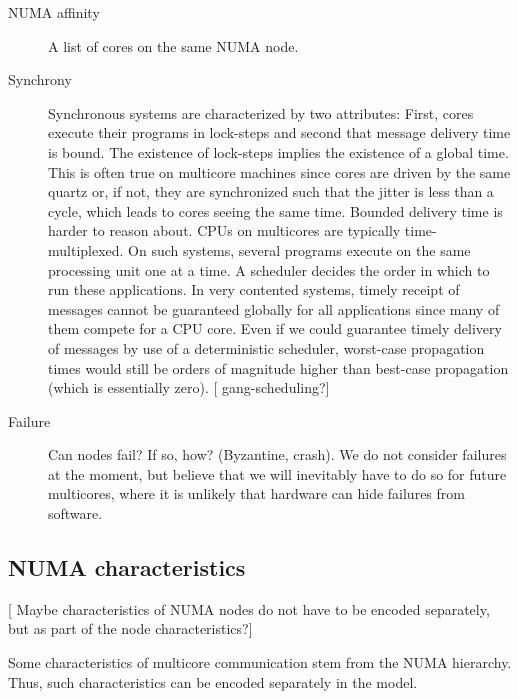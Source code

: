 \documentclass{article}
\newcommand{\stefan}[1]{
  {\color{skRed}[{\color{red}{SK}} #1]}}
\begin{document}
\begin{description}
\item[NUMA affinity] A list of cores on the same NUMA node.
\item[Synchrony] Synchronous systems are characterized by two
  attributes: First, cores execute their programs in lock-steps and
  second that message delivery time is bound.
  The existence of lock-steps implies the existence of a global time.
  This is often true on multicore machines since cores are driven by
  the same quartz or, if not, they are synchronized such that the
  jitter is less than a cycle, which leads to cores seeing the same
  time. %
  Bounded delivery time is harder to reason about. CPUs on multicores
  are typically time-multiplexed. On such systems, several programs
  execute on the same processing unit one at a time. A scheduler
  decides the order in which to run these applications. In very
  contented systems, timely receipt of messages cannot be guaranteed
  globally for all applications since many of them compete for a CPU
  core. Even if we could guarantee timely delivery of messages by use
  of a deterministic scheduler, worst-case propagation times would
  still be orders of magnitude higher than best-case propagation
  (which is essentially zero). \stefan{gang-scheduling?}
\item[Failure] Can nodes fail? If so, how? (Byzantine, crash). We do
  not consider failures at the moment, but believe that we will
  inevitably have to do so for future multicores, where it is unlikely
  that hardware can hide failures from software.
\end{description}

\subsection{NUMA characteristics}
\label{sec:model_numa_nodes}

\stefan{Maybe characteristics of NUMA nodes do not have to be encoded
  separately, but as part of the node characteristics?}

Some characteristics of multicore communication stem from the NUMA
hierarchy. Thus, such characteristics can be encoded separately in the
model.
\end{document}
